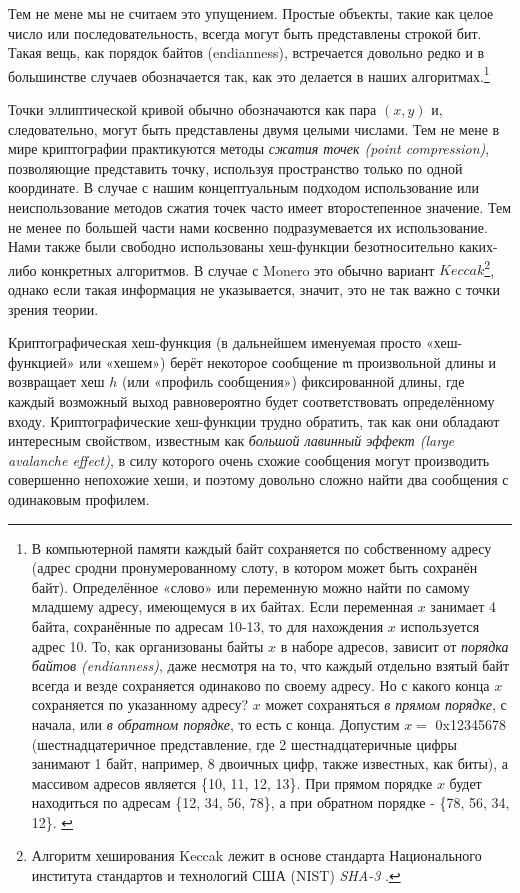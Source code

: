 Тем не мене мы не считаем это упущением. Простые объекты, такие как целое число или последовательность, всегда могут быть представлены строкой бит. Такая вещь, как порядок байтов (endianness), встречается довольно редко и в большинстве случаев обозначается так, как это делается в наших алгоритмах.\footnote{В компьютерной памяти каждый байт сохраняется по собственному адресу (адрес сродни пронумерованному слоту, в котором может быть сохранён байт). Определённое «слово» или переменную можно найти по самому младшему адресу, имеющемуся в их байтах. Если переменная $x$ занимает 4 байта, сохранённые по адресам 10-13, то для нахождения $x$ используется адрес 10. То, как организованы байты $x$ в наборе адресов, зависит от {\em порядка байтов (endianness)}, даже несмотря на то, что каждый отдельно взятый байт всегда и везде сохраняется одинаково по своему адресу. Но с какого конца $x$ сохраняется по указанному адресу? $x$ может сохраняться {\em в прямом порядке}, с начала, или {\em в обратном порядке}, то есть с конца. Допустим $x = $ 0x12345678 (шестнадцатеричное представление, где 2 шестнадцатеричные цифры занимают 1 байт, например, 8 двоичных цифр, также известных, как биты), а массивом адресов является \{10, 11, 12, 13\}. При прямом порядке $x$ будет находиться по адресам \{12, 34, 56, 78\}, а при обратном порядке - \{78, 56, 34, 12\}. \cite{endianness}}

Точки эллиптической кривой обычно обозначаются как пара \((x, y)\) и, следовательно, могут быть представлены двумя целыми числами. Тем не мене в мире криптографии практикуются методы {\em сжатия точек (point compression)}, позволяющие представить точку, используя про\-странство только по одной координате. В случае с нашим концептуальным подходом исполь\-зование или неиспользование методов сжатия точек часто имеет второстепенное значение. Тем не менее по большей части нами косвенно подразумевается их использование.\\

Нами также были свободно использованы хеш-функции безотносительно каких-либо конкрет\-ных алгоритмов. В случае с Monero это обычно вариант \(\mathit{Keccak}\)\footnote{\label{kekkak_note}Алгоритм хеширования Keccak лежит в основе стандарта Национального института стандартов и технологий США (NIST) {\em SHA-3} \cite{nist-sha3}.}, однако если такая информа\-ция не указывается, значит, это не так важно с точки зрения теории.

Криптографическая хеш-функция (в дальнейшем именуемая просто «хеш-функцией» или «хешем») берёт некоторое сообщение $\mathfrak{m}$ произвольной длины и возвращает хеш $h$ (или «про\-филь сообщения») фиксированной длины, где каждый возможный выход равновероятно будет соответствовать определённому входу. Криптографические хеш-функции трудно обратить, так как они обладают интересным свойством, известным как {\em большой лавинный эффект (large avalanche effect)}, в силу которого очень схожие сообщения могут производить совершенно непохожие хеши, и поэтому довольно сложно найти два сообщения с одинаковым профилем.

